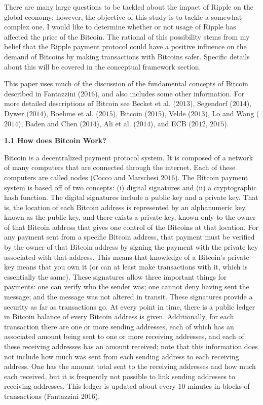 \documentclass{article}[10 pt]
\newcommand{\vs}{\vspace{0.1in}}
\begin{document}
There are many large questions to be tackled about the impact of Ripple on
the global economy; however, the objective of this study is to tackle a
somewhat complex one. I would like to determine whether or not usage of
Ripple has affected the price of the Bitcoin. The rational of this
possibility stems from my belief that the Ripple payment protocol could have
a positive influence on the demand of Bitcoins by making transactions with
Bitcoins safer. Specific details about this will be covered in the
conceptual framework section.

\vs

This paper uses much of the discussion of the fundamental concepts of
Bitcoin described in Fantazzini ($2016$), and also includes some other
information. For more detailed descriptions of Bitcoin see Becket et al.
($2013$), Segendorf ($2014$), Dywer ($2014$), Boehme et al. ($2015$),
Bitcoin ($2015$), Velde ($2013$), Lo and Wang ($2014$), Baden and Chen
($2014$), Ali et al. ($2014$), and ECB ($2012$, $2015$).

\vs

\textbf{1.1 How does Bitcoin Work?}

\vs

Bitcoin is a decentralized payment protocol system. It is composed of a
network of many computers that are connected through the internet. Each of
these computers are called nodes (Cocco and Marschesi $2016$).
The Bitcoin payment system is based off of two concepts: (i) digital
signatures and (ii) a cryptographic hash function. The digital signatures
include a public key and a private key. That is, the location of each
Bitcoin address is represented by an alphanumeric key, known as the public
key, and there exists a private key, known only to the owner of that Bitcoin
address that gives one control of the Bitcoins at that location. For any
payment sent from a specific Bitcoin address, that payment must be verified by
the owner of that Bitcoin address by signing the payment with the private
key associated with that address. This means that knowledge of a Bitcoin's
private key means that you own it (or can at least make transactions with
it, which is essentially the same). These signatures allow three important
things for payments: one can verify who the sender was; one cannot deny 
having sent the message; and the message was not altered in transit. These
signatures provide a security as far as transactions go. At every point in
time, there is a public ledger in Bitcoin balance of every Bitcoin address
is given. Additionally, for each transaction there are one or more sending 
addresses, each of which has an associated amount being sent to one or more
receiving addresses, and each of these receiving addresses has an amount
received; note that this information does not include how much was sent from
each sending address to each receiving address. One has the amount total
sent to the receiving addresses and how much each received, but it is frequently 
not possible to link sending addresses to receiving addresses.
This ledger is updated about every $10$ minutes in blocks of transactions
(Fantazzini $2016$).
\end{document}
